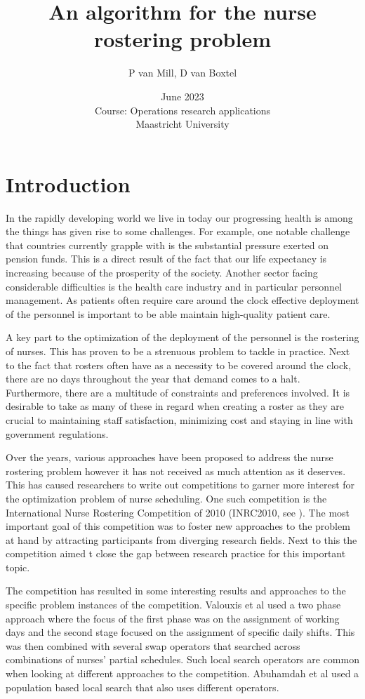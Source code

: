 \documentclass{article}
\title{An algorithm for the nurse rostering problem}
\author{P van Mill, D van Boxtel}
\date{June 2023 \\
Course: Operations research applications \\
Maastricht University}
\begin{document}
\maketitle

\section{Introduction}

In the rapidly developing world we live in today our progressing health is among the things has given rise to some challenges.
For example, one notable challenge that countries currently grapple with is the substantial pressure exerted on pension funds.
This is a direct result of the fact that our life expectancy is increasing because of the prosperity of the society.
Another sector facing considerable difficulties is the health care industry and in particular personnel management.
As patients often require care around the clock effective deployment of the personnel is important to be able maintain high-quality patient care.

A key part to the optimization of the deployment of the personnel is the rostering of nurses.
This has proven to be a strenuous problem to tackle in practice.
Next to the fact that rosters often have as a necessity to be covered around the clock, there are no days throughout the year that demand comes to a halt.
Furthermore, there are a multitude of constraints and preferences involved.
It is desirable to take as many of these in regard when creating a roster as they are crucial to maintaining staff satisfaction, minimizing cost and staying in line with government regulations.

Over the years, various approaches have been proposed to address the nurse rostering problem however it has not received as much attention as it deserves.
This has caused researchers to write out competitions to garner more interest for the optimization problem of nurse scheduling.
One such competition is the International Nurse Rostering Competition of 2010 (INRC2010, see \cite{inrc}).
The most important goal of this competition was to foster new approaches to the problem at hand by attracting participants from diverging research fields.
Next to this the competition aimed t close the gap between research practice for this important topic.

The competition has resulted in some interesting results and approaches to the specific problem instances of the competition.
Valouxis et al used a two phase approach where the focus of the first phase was on the assignment of working days and the second stage focused on the assignment of specific daily shifts\cite{Valouxis}.
This was then combined with several swap operators that searched across combinations of nurses' partial schedules.
Such local search operators are common when looking at different approaches to the competition.
Abuhamdah et al used a population based local search that also uses different operators\cite{Abuhamdah}.
\end{document}
